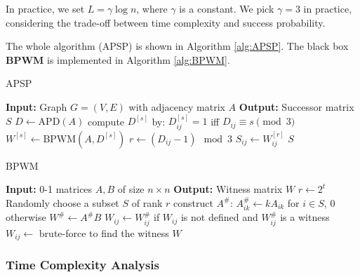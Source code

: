 \documentclass[11pt]{article}
\theoremstyle{plain}
\begin{document}
In practice, we set $L=\gamma\log n$, where $\gamma$ is a constant. We pick $\gamma=3$ in practice, considering the trade-off between time complexity and success probability. 

The whole algorithm (APSP) is shown in Algorithm \ref{alg:APSP}. The black box \textbf{BPWM} is implemented in Algorithm \ref{alg:BPWM}.

\begin{algorithm}
    \caption{APSP}
    \label{alg:APSP}
    \begin{algorithmic}[1]
        \STATE \textbf{Input:} Graph $G=(V,E)$ with adjacency matrix $A$
        \STATE \textbf{Output:} Successor matrix $S$
        \STATE $D\leftarrow \text{APD}(A)$
            \STATE compute $D^{[s]}$ by: $D^{[s]}_{ij}=1$ iff $D_{ij}\equiv s\pmod 3$
            \STATE $W^{[s]}\leftarrow \text{BPWM}(A,D^{[s]})$
        \ENDFOR
                \STATE $r\leftarrow (D_{ij}-1)\mod 3$
                \STATE $S_{ij}\leftarrow W^{[r]}_{ij}$
            \ENDFOR
        \ENDFOR
    \RETURN $S$
    \end{algorithmic}
\end{algorithm}

\begin{algorithm}
    \caption{BPWM}
    \label{alg:BPWM}
    \begin{algorithmic}[1]
        \STATE \textbf{Input:} 0-1 matrices $A,B$ of size $n\times n$
        \STATE \textbf{Output:} Witness matrix $W$
            \STATE $r\leftarrow 2^t$
                \STATE Randomly choose a subset $S$ of rank $r$
                \STATE construct $A^{\#}$: $A^{\#}_{ik}\leftarrow kA_{ik}$ for $i\in S$, $0$ otherwise
                \STATE $W^{\#}\leftarrow A^{\#}B$
                    \STATE $W_{ij}\leftarrow W^{\#}_{ij}$ if $W_{ij}$ is not defined and $W^{\#}_{ij}$ is a witness
                \ENDFOR
            \ENDFOR
        \ENDFOR
                \STATE $W_{ij}\leftarrow$ brute-force to find the witness
            \ENDIF
        \ENDFOR
    \RETURN $W$
    \end{algorithmic}
\end{algorithm}

\subsubsection{Time Complexity Analysis}
\end{document}
